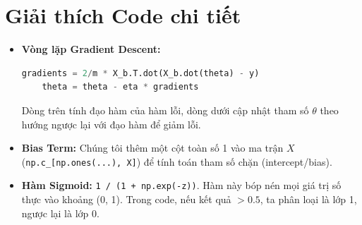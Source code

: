 \documentclass{article}
\begin{document}
\section{Giải thích Code chi tiết}
\begin{itemize}
    \item \textbf{Vòng lặp Gradient Descent:}
    \begin{lstlisting}[language=Python]
    gradients = 2/m * X_b.T.dot(X_b.dot(theta) - y)
    theta = theta - eta * gradients
    \end{lstlisting}
    Dòng trên tính đạo hàm của hàm lỗi, dòng dưới cập nhật tham số $\theta$ theo hướng ngược lại với đạo hàm để giảm lỗi.
    \item \textbf{Bias Term:} Chúng tôi thêm một cột toàn số 1 vào ma trận $X$ (\texttt{np.c\_[np.ones(...), X]}) để tính toán tham số chặn (intercept/bias).
    \item \textbf{Hàm Sigmoid:} \texttt{1 / (1 + np.exp(-z))}. Hàm này bóp nén mọi giá trị số thực vào khoảng (0, 1). Trong code, nếu kết quả $> 0.5$, ta phân loại là lớp 1, ngược lại là lớp 0.
\end{itemize}
\end{document}

